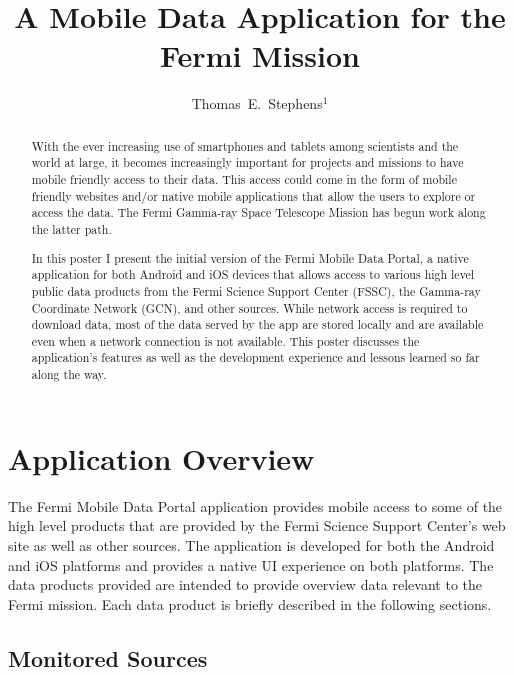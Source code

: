 
\resetcounters


\title{A Mobile Data Application for the Fermi Mission}
\author{Thomas~E.~Stephens$^1$}


\begin{abstract}
With the ever increasing use of smartphones and tablets among scientists and the world at large, it becomes increasingly important for projects and missions to have mobile friendly access to their data. This access could come in the form of mobile friendly websites and/or native mobile applications that allow the users to explore or access the data. The Fermi Gamma-ray Space Telescope Mission has begun work along the latter path.

In this poster I present the initial version of the Fermi Mobile Data Portal, a native application for both Android and iOS devices that allows access to various high level public data products from the Fermi Science Support Center (FSSC), the Gamma-ray Coordinate Network (GCN), and other sources. While network access is required to download data, most of the data served by the app are stored locally and are available even when a network connection is not available. This poster discusses the application's features as well as the development experience and lessons learned so far along the way. 
\end{abstract}

\section{Application Overview}
The Fermi Mobile Data Portal application provides mobile access to some of the high level products  that are provided by the Fermi Science Support Center's web site as well as other sources.  The application is developed for both the Android and iOS platforms and provides a native UI experience on both platforms.  The data products provided are intended to provide overview data relevant to the Fermi mission.  Each data product is briefly described in the following sections.

\subsection{Monitored Sources}

